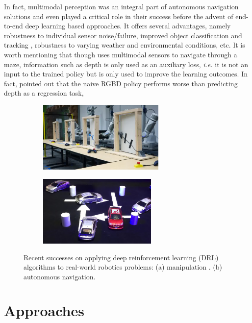 \documentclass[../thesis.tex]{subfiles}
\begin{document}
In fact, multimodal perception was an integral part of autonomous navigation solutions and even played a critical role in their success \cite{multimodaltartan} before the advent of end-to-end deep learning based approaches. 
It offers several advantages, namely robustness to individual sensor noise/failure, improved object classification and tracking \cite{elfring2016multisensor, cho2014multi, darms2008classification}, robustness to varying weather and environmental conditions, etc. 
It is worth mentioning that though \citet{mirowski2017a} uses multimodal sensors to navigate through a maze, information such as depth is only used as an auxiliary loss, \textit{i.e.} it is not an input to the trained policy but is only used to improve the learning outcomes. 
In fact, \citet{mirowski2017a} pointed out that the naive RGBD policy performs worse than predicting depth as a regression task,
 
 
\begin{figure}[b]
    \vskip -0.1in
    \centering
    \begin{subfigure}[b]{0.45\linewidth}
        \includegraphics[height=3.5cm]{./Introduction/fig/drl_manipulation.jpg}
    \end{subfigure}
    \begin{subfigure}[b]{0.45\linewidth}
        \includegraphics[height=3.5cm]{./Introduction/fig/drl_perfer_network.jpg}
    \end{subfigure}
    \caption{Recent successes on applying deep reinforcement learning (DRL) algorithms to real-world robotics problems: (a) manipulation \cite{gu2016deep}. (b) autonomous navigation. \cite{prefernetwork}}
    \label{fig:end-to-end}
\end{figure}
 
 
\section{Approaches}
 
\end{document}
